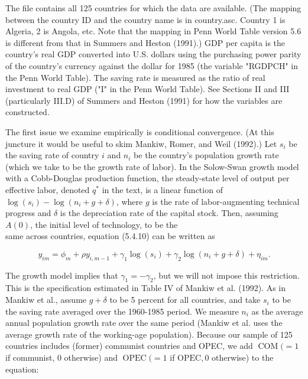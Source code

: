 \documentclass[10pt]{article}
\begin{document}
The file contains all 125 countries for which the data are available. (The mapping between the country ID and the country name is in country.asc. Country 1 is Algeria, 2 is Angola, etc. Note that the mapping in Penn World Table version 5.6 is different from that in Summers and Heston (1991).) GDP per capita is the country's real GDP converted into U.S. dollars using the purchasing power parity of the country's currency against the dollar for 1985 (the variable "RGDPCH" in the Penn World Table). The saving rate is measured as the ratio of real investment to real GDP ("I" in the Penn World Table). See Sections II and III (particularly III.D) of Summers and Heston (1991) for how the variables are constructed.

The first issue we examine empirically is conditional convergence. (At this juncture it would be useful to skim Mankiw, Romer, and Weil (1992).) Let $s_{i}$ be the saving rate of country $i$ and $n_{i}$ be the country's population growth rate (which we take to be the growth rate of labor). In the Solow-Swan growth model with a Cobb-Douglas production function, the steady-state level of output per effective labor, denoted $q^{*}$ in the text, is a linear function of $\log \left(s_{i}\right)-\log \left(n_{i}+g+\delta\right)$, where $g$ is the rate of labor-augmenting technical progress and $\delta$ is the depreciation rate of the capital stock. Then, assuming $A(0)$, the initial level of technology, to be the\\
same across countries, equation (5.4.10) can be written as


\begin{equation*}
y_{i m}=\phi_{m}+\rho y_{i, m-1}+\gamma_{1} \log \left(s_{i}\right)+\gamma_{2} \log \left(n_{i}+g+\delta\right)+\eta_{i m} . \tag{1}
\end{equation*}


The growth model implies that $\gamma_{1}=-\gamma_{2}$, but we will not impose this restriction. This is the specification estimated in Table IV of Mankiw et al. (1992). As in Mankiw et al., assume $g+\delta$ to be 5 percent for all countries, and take $s_{i}$ to be the saving rate averaged over the 1960-1985 period. We measure $n_{i}$ as the average annual population growth rate over the same period (Mankiw et al. uses the average growth rate of the working-age population). Because our sample of 125 countries includes (former) communist countries and OPEC, we add $\operatorname{COM}(=1$ if communist, 0 otherwise) and $\operatorname{OPEC}(=1$ if $\mathrm{OPEC}, 0$ otherwise) to the equation:
\end{document}
